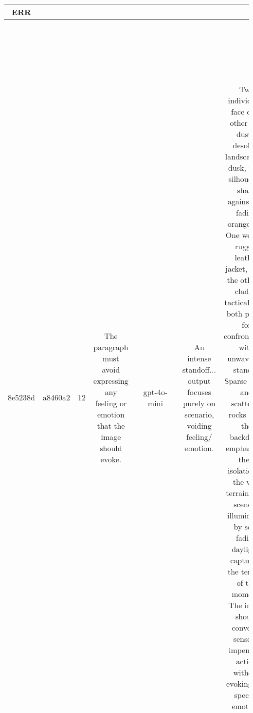 \begin{table}[h!]
\begin{tabular}{|c|c|c|c|c|c|c|c|c|c|}
ERR & \\
\hline
8e5238d & a8460a2 & 12 & The paragraph must avoid expressing any feeling or emotion that the image should evoke. & gpt-4o-mini & An intense standoff... output focuses purely on scenario, voiding feeling/ emotion. & Two individuals face each other in a dusty, desolate landscape at dusk, their silhouettes sharp against the fading orange sky. One wears a rugged leather jacket, while the other is clad in tactical gear, both poised for confrontation with unwavering stances. Sparse brush and scattered rocks form the backdrop, emphasizing their isolation in the vast terrain. The scene is illuminated by soft, fading daylight, capturing the tension of the moment. The image should convey a sense of impending action without evoking any specific emotion. & ok & The output provided by the chatbot appears to adhere to the rules outlined in the description. The text is crafted in a single paragraph and does not exceed 80 words. It begins by detailing the subjects, specifying two individuals with distinct characteristics (one in a leather jacket and the other in tactical gear), then continues by describing the setting (a dusty, desolate landscape at dusk) and the lighting (soft, fading daylight). The background is described with sparse brush and scattered rocks, and the scene is meant to evoke a sense of impending action, although it explicitly states it should not evoke a specific emotion. Given these observations, the output meets the expectations set forth by the description.

OK & \\
\hline
8e5238d & a8460a2 & 12 & The paragraph must avoid expressing any feeling or emotion that the image should evoke. & gemma2:9b & An intense standoff... output focuses purely on scenario, voiding feeling/ emotion. & Two figures stand face to face in a dimly lit alleyway, shadows stretching long and thick around them. Each holds a weapon aimed squarely at the other, rifles gleaming menacingly under flickering lamplight. Dust motes dance in the air, caught in the beam of moonlight slicing through the grime-stained brick walls that enclose them. The silence is palpable, broken only by the hiss of distant traffic and the ticking of a nearby clock. 


 & ok & The chatbot output is evaluated based on the specified description. The output provides a detailed image description. It mentions the subjects ("Two figures") and gives them characteristics ("Each holds a weapon aimed squarely at the other, rifles gleaming menacingly"). It continues with details about the timing and lighting ("dimly lit alleyway," "flickering lamplight," "moonlight slicing through the grime-stained brick walls"). The background is described with "dimly lit alleyway," "shadows," "grime-stained brick walls," and "distant traffic." The feeling evoked by the image is conveyed through words like "shadows stretching long and thick," "menacingly," and "silence is palpable." The description is within 80 words and is composed in a single paragraph, fulfilling the requirements.


\end{tabular}
\end{table}
